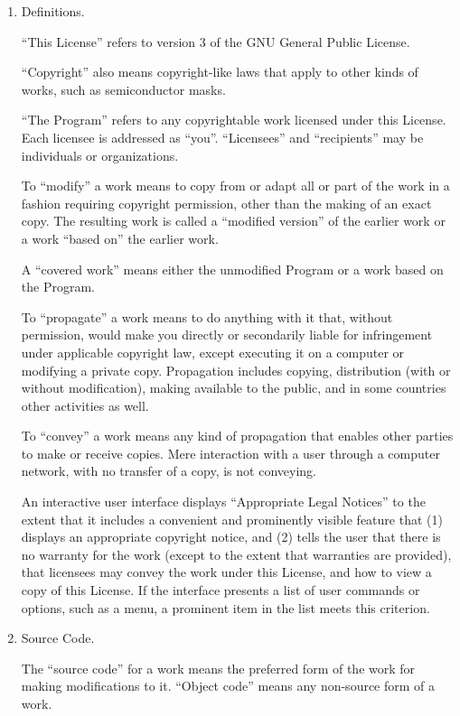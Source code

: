 \scriptsize
\begin{enumerate}

\addtocounter{enumi}{-1}

\item Definitions.

``This License'' refers to version 3 of the GNU General Public License.

``Copyright'' also means copyright-like laws that apply to other kinds of
works, such as semiconductor masks.

``The Program'' refers to any copyrightable work licensed under this
License.  Each licensee is addressed as ``you''.  ``Licensees'' and
``recipients'' may be individuals or organizations.

To ``modify'' a work means to copy from or adapt all or part of the work
in a fashion requiring copyright permission, other than the making of an
exact copy.  The resulting work is called a ``modified version'' of the
earlier work or a work ``based on'' the earlier work.

A ``covered work'' means either the unmodified Program or a work based
on the Program.

To ``propagate'' a work means to do anything with it that, without
permission, would make you directly or secondarily liable for
infringement under applicable copyright law, except executing it on a
computer or modifying a private copy.  Propagation includes copying,
distribution (with or without modification), making available to the
public, and in some countries other activities as well.

To ``convey'' a work means any kind of propagation that enables other
parties to make or receive copies.  Mere interaction with a user through
a computer network, with no transfer of a copy, is not conveying.

An interactive user interface displays ``Appropriate Legal Notices''
to the extent that it includes a convenient and prominently visible
feature that (1) displays an appropriate copyright notice, and (2)
tells the user that there is no warranty for the work (except to the
extent that warranties are provided), that licensees may convey the
work under this License, and how to view a copy of this License.  If
the interface presents a list of user commands or options, such as a
menu, a prominent item in the list meets this criterion.

\item Source Code.

The ``source code'' for a work means the preferred form of the work
for making modifications to it.  ``Object code'' means any non-source
form of a work.


\end{enumerate}
